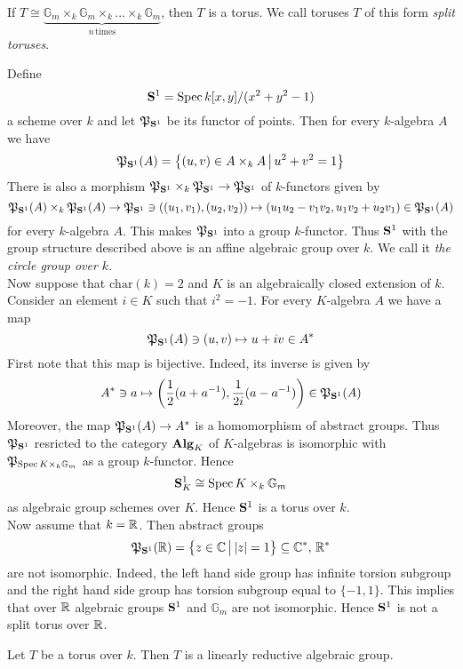 \begin{example}\label{example:split_torus}
If $T \cong \underbrace{\mathbb{G}_{m}\times_k \mathbb{G}_{m}\times_k ...\times_k \mathbb{G}_{m}}_{n\,\mathrm{times}}$, then $T$ is a torus. We call toruses $T$ of this form \textit{split toruses}.
\end{example}

\begin{example}\label{example:non_split_torus}
Define
$$\mathbf{S}^1 = \mathrm{Spec}\, k[x,y]/(x^2+y^2-1)$$
a scheme over $k$ and let ${\mathfrak P}_{\mathbf{S}^1}$ be its functor of points. Then for every $k$-algebra $A$ we have
$${\mathfrak P}_{\mathbf{S}^1}(A) = \big\{(u,v)\in A\times_k A\,\big|\,u^2+v^2=1\big\}$$
There is also a morphism ${\mathfrak P}_{\mathbf{S}^1}\times_k {\mathfrak P}_{\mathbf{S}^1}\rightarrow {\mathfrak P}_{\mathbf{S}^1}$ of $k$-functors given by
$${\mathfrak P}_{\mathbf{S}^1}(A)\times_k {\mathfrak P}_{\mathbf{S}^1}(A)\rightarrow {\mathfrak P}_{\mathbf{S}^1}\ni \left((u_1,v_1),(u_2,v_2)\right)\mapsto (u_1u_2-v_1v_2,u_1v_2+u_2v_1)\in {\mathfrak P}_{\mathbf{S}^1}(A)$$
for every $k$-algebra $A$. This makes ${\mathfrak P}_{\mathbf{S}^1}$ into a group $k$-functor. Thus $\mathbf{S}^1$ with the group structure described above is an affine algebraic group over $k$. We call it \textit{the circle group over $k$}.\\
Now suppose that $\mathrm{char}(k)=2$ and $K$ is an algebraically closed extension of $k$. Consider an element $i\in K$ such that $i^2 = -1$. For every $K$-algebra $A$ we have a map
$${\mathfrak P}_{\mathbf{S}^1}(A)\ni (u,v)\mapsto u+iv\in A^*$$
First note that this map is bijective. Indeed, its inverse is given by
$$A^*\ni a \mapsto \left(\frac{1}{2}(a+a^{-1}),\frac{1}{2i}(a-a^{-1})\right) \in {\mathfrak P}_{\mathbf{S}^1}(A)$$
Moreover, the map ${\mathfrak P}_{\mathbf{S}^1}(A)\rightarrow A^*$ is a homomorphism of abstract groups. Thus ${\mathfrak P}_{\mathbf{S}^1}$ resricted to the category $\mathbf{Alg}_K$ of $K$-algebras is isomorphic with ${\mathfrak P}_{\mathrm{Spec}\, K\times_k \mathbb{G}_{m}}$ as a group $k$-functor. Hence
$$\mathbf{S}^1_K \cong \mathrm{Spec}\, K\times_k \mathbb{G}_{m}$$
as algebraic group schemes over $K$. Hence $\mathbf{S}^1$ is a torus over $k$.\\
Now assume that $k = {\mathbb R}$. Then abstract groups
$${\mathfrak P}_{\mathbf{S}^1}({\mathbb R}) = \big\{z\in {\mathbb C}\,\big|\,|z|=1\big\} \subseteq {\mathbb C}^*,\,{\mathbb R}^*$$
are not isomorphic. Indeed, the left hand side group has infinite torsion subgroup and the right hand side group has torsion subgroup equal to $\{-1,1\}$. This implies that over ${\mathbb R}$ algebraic groups $\mathbf{S}^1$ and $\mathbb{G}_{m}$ are not isomorphic. Hence $\mathbf{S}^1$ is not a split torus over ${\mathbb R}$.
\end{example}

\begin{corollary}\label{corollary:toruses_are_linearly_reductive}
Let $T$ be a torus over $k$. Then $T$ is a linearly reductive algebraic group.
\end{corollary}

